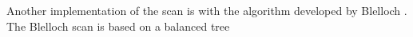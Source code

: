 Another implementation of the scan is with the algorithm developed by Blelloch \cite{BlellochTR90}. The Blelloch scan is based on a balanced tree